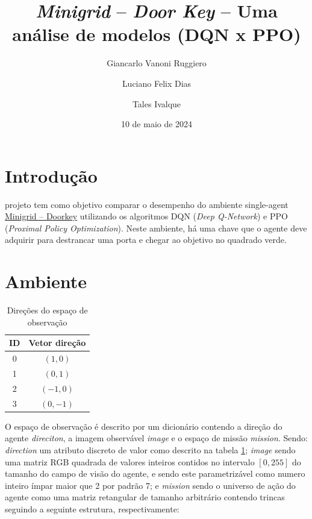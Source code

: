 \documentclass[9pt,a4paper,twoside]{tau}
\title{\textit{Minigrid} -- \textit{Door Key} -- Uma análise de modelos (DQN x PPO)}
\author{Giancarlo Vanoni Ruggiero}
\author{Luciano Felix Dias}
\author{Tales Ivalque}
\affil{Engenharia da Computação, INSPER}
\date{10 de maio de 2024}
\begin{document}
\maketitle
\thispagestyle{firststyle}
\tauabstract


\section{Introdução}

 projeto tem como objetivo comparar o desempenho do ambiente single-agent
\href{https://minigrid.farama.org/environments/minigrid/DoorKeyEnv/}{Minigrid -- Doorkey}
utilizando os algoritmos DQN (\textit{Deep Q-Network}) e PPO (\textit{Proximal Policy Optimization}). Neste ambiente, há uma chave que o agente deve adquirir para destrancar uma porta e chegar ao objetivo no quadrado verde.

\section{Ambiente}

\begin{table}[htbp]
    \caption{Direções do espaço de observação}
    \label{tab:directions}
    \centering
    \begin{tabular}{cc}
        \toprule
        \textbf{ID} & \textbf{Vetor direção} \\
        \midrule
        0           & \(( 1,  0)\)           \\
        1           & \(( 0,  1)\)           \\
        2           & \((-1,  0)\)           \\
        3           & \(( 0, -1)\)           \\
        \bottomrule
    \end{tabular}
\end{table}

O espaço de observação é descrito por um dicionário contendo a direção do agente \textit{direciton}, a imagem observável \textit{image} e o espaço de missão \textit{mission}. Sendo: \textit{direction} um atributo discreto de valor como descrito na tabela \ref{tab:directions}; \textit{image} sendo uma matriz RGB quadrada de valores inteiros contidos no intervalo \([0, 255]\) do tamanho do campo de visão do agente, e sendo este parametrizável como numero inteiro ímpar maior que 2 por padrão 7; e \textit{mission} sendo o universo de ação do agente como uma matriz retangular de tamanho arbitrário contendo trincas seguindo a seguinte estrutura, respectivamente:
\end{document}
